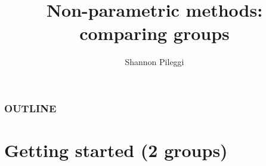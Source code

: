 



\title[Set 7]{Non-parametric methods: comparing groups}
\author[Pileggi]{Shannon Pileggi}


\date{}




\begin{frame}
\titlepage
\end{frame}

\begin{frame}
\frametitle{OUTLINE\qquad\qquad\qquad} \tableofcontents[hideallsubsections]
\end{frame}


\section[Getting started (2 groups)]{Getting started (2 groups)}
\subsection{}

